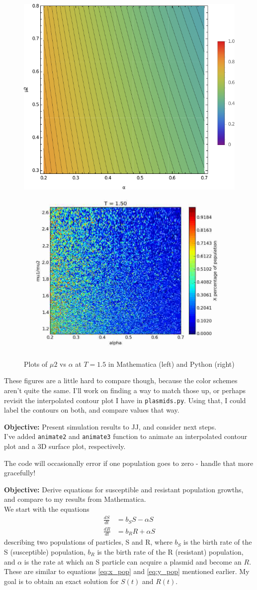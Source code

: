 \documentclass[oneside]{labbook}
\newcommand{\obj}[1]{\textbf{Objective:} #1\\}
\begin{document}
\begin{figure}[h!]
\includegraphics[width=.5\columnwidth]{mathematica_T1_5.pdf}
\includegraphics[width=.5\columnwidth]{python_T1_5.pdf}
\caption{Plots of $\mu2$ vs $\alpha$ at $T=1.5$ in Mathematica (left) and Python (right)}
\end{figure}

These figures are a little hard to compare though, because the color schemes
aren't quite the same. I'll work on finding a way to match those up, or perhaps
revisit the interpolated contour plot I have in \texttt{plasmids.py}. Using that,
I could label the contours on both, and compare values that way.



\obj{Present simulation results to JJ, and consider next steps.}

I've added \texttt{animate2} and \texttt{animate3} function to animate an
interpolated contour plot and a 3D surface plot, respectively.

The code will occasionally error if one population goes to zero - handle that
more gracefully!


\obj{Derive equations for susceptible and resistant population growths, and
compare to my results from Mathematica.}

We start with the equations
\begin{align}
  \frac{dS}{dt} & = b_S S - \alpha S \label{eq:S_growth}\\
  \frac{dR}{dt} & = b_R R + \alpha S \label{eq:R_growth}
\end{align}
describing two populations of particles, S and R, where $b_S$ is the birth rate
of the S (susceptible) population, $b_R$ is the birth rate of the R (resistant)
population, and $\alpha$ is the rate at which an S particle can acquire a plasmid
and become an $R$. These are similar to equations
\eqref{eq:x_pop} and \eqref{eq:y_pop} mentioned earlier. My goal is to obtain an
exact solution for $S(t)$ and $R(t)$.
\end{document}
